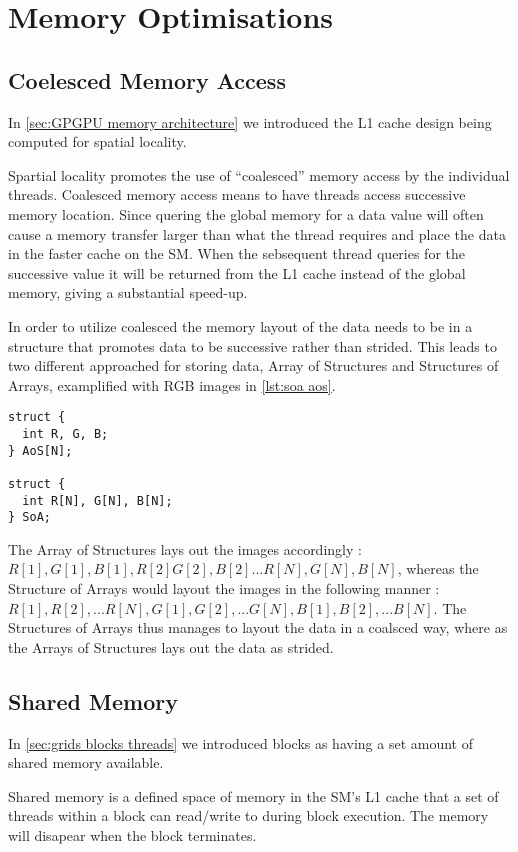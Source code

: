 \section{Memory Optimisations}
\label{sec:memory optimisations}
\subsection{Coelesced Memory Access}
\label{sec:coalesced}

In \cref{sec:GPGPU memory architecture} we introduced the L1 cache design being computed for spatial locality.

Spartial locality promotes the use of ``coalesced'' memory access by the individual threads.
Coalesced memory access means to have threads access successive memory location.
Since quering the global memory for a data value will often cause a memory transfer larger than what the thread requires and place the data in the faster cache on the SM.
When the sebsequent thread queries for the successive value it will be returned from the L1 cache instead of the global memory, giving a substantial speed-up.

In order to utilize coalesced the memory layout of the data needs to be in a structure that promotes data to be successive rather than strided.\cite{udacity}
This leads to two different approached for storing data, Array of Structures and Structures of Arrays, examplified with RGB images in \cref{lst:soa aos}.

\begin{lstlisting}[caption={Example of SoA and AoS with RGB images}, label={lst:soa aos}]
struct {
  int R, G, B;
} AoS[N];

struct {
  int R[N], G[N], B[N];
} SoA;
\end{lstlisting}

The Array of Structures lays out the images accordingly : $R[1], G[1], B[1], R[2] G[2], B[2] ... R[N], G[N], B[N]$, whereas the Structure of Arrays would layout the images in the following manner : $R[1], R[2], ... R[N], G[1], G[2], ... G[N], B[1], B[2], ... B[N]$.
The Structures of Arrays thus manages to layout the data in a coalsced way, where as the Arrays of Structures lays out the data as strided.

\subsection{Shared Memory}
In \cref{sec:grids blocks threads} we introduced blocks as having a set amount of shared memory available.

Shared memory is a defined space of memory in the SM's L1 cache that a set of threads within a block can read/write to during block execution.
The memory will disapear when the block terminates.

